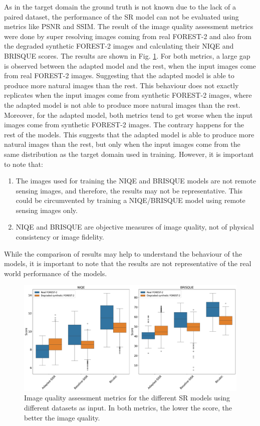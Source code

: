     As in the target domain the ground truth is not known due to the lack of a paired dataset, the performance of the SR model can not be evaluated using metrics like PSNR and SSIM.
    The result of the image quality assessment metrics were done by super resolving images coming from real FOREST-2 and also from the degraded synthetic FOREST-2 images and calculating their NIQE and BRISQUE scores.
    The results are shown in Fig. \ref{fig:5-target-iqa-results}.
    For both metrics, a large gap is observed between the adapted model and the rest, when the input images come from real FOREST-2 images. 
    Suggesting that the adapted model is able to produce more natural images than the rest.
    This behaviour does not exactly replicates when the input images come from synthetic FOREST-2 images, where the adapted model is not able to produce more natural images than the rest.
    Moreover, for the adapted model, both metrics tend to get worse when the input images come from synthetic FOREST-2 images. The contrary happens for the rest of the models.
    This suggests that the adapted model is able to produce more natural images than the rest, but only when the input images come from the same distribution as the target domain used in training.
    However, it is important to note that: 

    \begin{enumerate}
        \item The images used for training the NIQE and BRISQUE models are not remote sensing images, and therefore, the results may not be representative. This could be circumvented by training a NIQE/BRISQUE model using remote sensing images only.
        \item NIQE and BRISQUE are objective measures of image quality, not of physical consistency or image fidelity.
    \end{enumerate}

    While the comparison of results may help to understand the behaviour of the models, it is important to note that the results are not representative of the real world performance of the models. 

        \begin{figure}[H]
            \centering
            \includegraphics[scale=0.28]{Includes/5-target-iqa-results.pdf}
            \caption{Image quality assessment metrics for the different SR models using different datasets as input. 
                    In both metrics, the lower the score, the better the image quality.}
            \label{fig:5-target-iqa-results}
        \end{figure}


        

        
\newpage
    